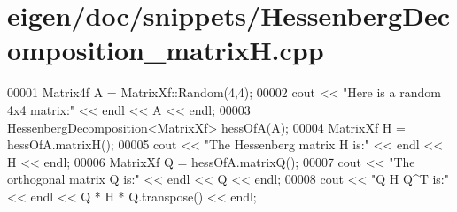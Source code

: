 \hypertarget{eigen_2doc_2snippets_2_hessenberg_decomposition__matrix_h_8cpp_source}{}\section{eigen/doc/snippets/\+Hessenberg\+Decomposition\+\_\+matrixH.cpp}
\label{eigen_2doc_2snippets_2_hessenberg_decomposition__matrix_h_8cpp_source}

\begin{DoxyCode}
00001 Matrix4f A = MatrixXf::Random(4,4);
00002 cout << \textcolor{stringliteral}{"Here is a random 4x4 matrix:"} << endl << A << endl;
00003 HessenbergDecomposition<MatrixXf> hessOfA(A);
00004 MatrixXf H = hessOfA.matrixH();
00005 cout << \textcolor{stringliteral}{"The Hessenberg matrix H is:"} << endl << H << endl;
00006 MatrixXf Q = hessOfA.matrixQ();
00007 cout << \textcolor{stringliteral}{"The orthogonal matrix Q is:"} << endl << Q << endl;
00008 cout << \textcolor{stringliteral}{"Q H Q^T is:"} << endl << Q * H * Q.transpose() << endl;
\end{DoxyCode}
